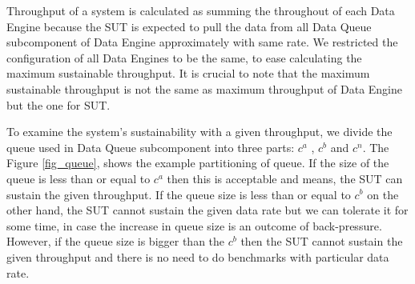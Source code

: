 Throughput of a system is calculated as summing the throughout of each Data Engine  because the SUT is expected to pull the data from all Data Queue subcomponent of Data Engine approximately with same rate. We restricted the configuration of all Data Engines to be the same, to ease calculating the maximum sustainable throughput. It is crucial to note that the maximum sustainable throughput is not the same as maximum throughput of Data Engine but the one for SUT. 

To examine the system's sustainability with a given throughput, we divide the queue used in Data Queue subcomponent into three parts: $c^{a}$ , $c^{b}$ and $c^{n}$. The Figure \ref{fig_queue}, shows the example partitioning of queue. If the size of the queue is less than or equal to $c^{a}$ then this is acceptable and means, the SUT can sustain the given throughput. If the queue size is less than or equal to $c^{b}$ on the other hand, the SUT cannot sustain the given data rate but we can tolerate it for some time, in case the increase in queue size is an outcome of back-pressure. However, if the queue size is bigger than the $c^{b}$ then the SUT cannot sustain the given throughput and there is no need to do benchmarks with particular data rate.

